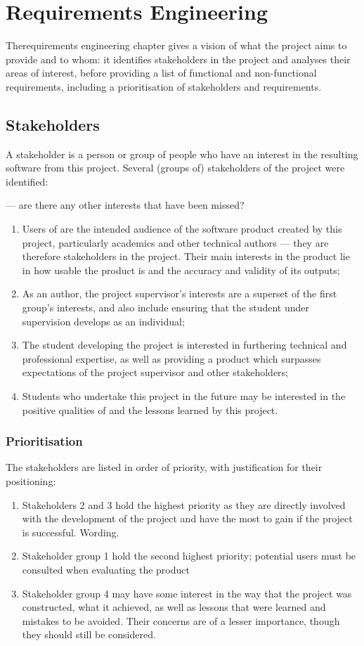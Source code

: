 \chapter{Requirements Engineering}
\label{reqs}
Therequirements engineering chapter gives a vision of what the project aims to provide and to whom: it identifies stakeholders in the project and analyses their areas of interest, before providing a list of functional and non-functional requirements, including a prioritisation of stakeholders and requirements.

\section{Stakeholders}
A stakeholder is a person or group of people who have an interest in the resulting software from this project.  Several (groups of) stakeholders of the project were identified: 

\revisit --- are there any other interests that have been missed?

\begin{enumerate}
	\item Users of \bibtex{} are the intended audience of the software product created by this project, particularly academics and other technical authors --- they are therefore stakeholders in the project.  Their main interests in the product lie in how usable the product is and the accuracy and validity of its outputs;
	\item As an author, the project supervisor's interests are a superset of the first group's interests, and also include ensuring that the student under supervision develops as an individual;
	\item The student developing the project is interested in furthering technical and professional expertise, as well as providing a product which surpasses expectations of the project supervisor and other stakeholders;
	\item Students who undertake this project in the future may be interested in the positive qualities of and the lessons learned by this project.
\end{enumerate}

\subsection*{Prioritisation}
The stakeholders are listed in order of priority, with justification for their positioning:
\begin{enumerate}
	\item Stakeholders 2 and 3 hold the highest priority as they are directly involved with the development of the project and have the most to gain if the project is successful. \revisit Wording.
	\item Stakeholder group 1 hold the second highest priority; potential users must be consulted when evaluating the product
	\item Stakeholder group 4 may have some interest in the way that the project was constructed, what it achieved, as well as lessons that were learned and mistakes to be avoided.  Their concerns are of a lesser importance, though they should still be considered.
\end{enumerate}


